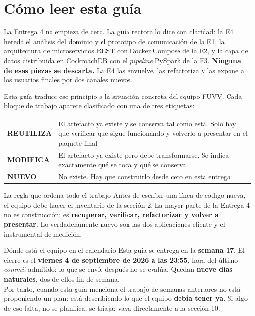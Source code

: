 \documentclass[11pt,a4paper]{article}
\newcommand{\reuso}{\cellcolor{filaReuso}\textbf{REUTILIZA}}
\newcommand{\cambia}{\cellcolor{filaCambia}\textbf{MODIFICA}}
\newcommand{\nuevo}{\cellcolor{filaNuevo}\textbf{NUEVO}}
\begin{document}
\tableofcontents
\newpage

\section{Cómo leer esta guía}

La Entrega 4 no empieza de cero. La guía rectora lo dice con claridad: la E4 hereda el análisis del dominio y el prototipo de comunicación de la E1, la arquitectura de microservicios REST con Docker Compose de la E2, y la capa de datos distribuida en CockroachDB con el \emph{pipeline} PySpark de la E3. \textbf{Ninguna de esas piezas se descarta.} La E4 las envuelve, las refactoriza y las expone a los usuarios finales por dos canales nuevos.

Esta guía traduce ese principio a la situación concreta del equipo FUVV. Cada bloque de trabajo aparece clasificado con una de tres etiquetas:

\begin{center}
	\small
	\begin{tabular}{@{}p{2.6cm}p{12.6cm}@{}}
		\toprule
		\reuso & El artefacto ya existe y se conserva tal como está. Solo hay que verificar que sigue funcionando y volverlo a presentar en el paquete final \\
		\addlinespace
		\cambia & El artefacto ya existe pero debe transformarse. Se indica exactamente qué se toca y qué se conserva \\
		\addlinespace
		\nuevo & No existe. Hay que construirlo desde cero en esta entrega \\
		\bottomrule
	\end{tabular}
\end{center}

\begin{uteqbox}{La regla que ordena todo el trabajo}
	Antes de escribir una línea de código nueva, el equipo debe hacer el inventario de la sección 2. La mayor parte de la Entrega 4 no es construcción: es \textbf{recuperar, verificar, refactorizar y volver a presentar}. Lo verdaderamente nuevo son las dos aplicaciones cliente y el instrumental de medición.
\end{uteqbox}

\begin{pisoBox}{Dónde está el equipo en el calendario}
	Esta guía se entrega en la \textbf{semana 17}. El cierre es el \textbf{viernes 4 de septiembre de 2026 a las 23:55}, hora del último \emph{commit} admitido: lo que se envíe después no se evalúa. Quedan \textbf{nueve días naturales}, dos de ellos fin de semana.\\[5pt]
	Por tanto, cuando esta guía menciona el trabajo de semanas anteriores no está proponiendo un plan: está describiendo lo que el equipo \textbf{debía tener ya}. Si algo de eso falta, no se planifica, se triaja: vaya directamente a la sección 10.
\end{pisoBox}
\end{document}
